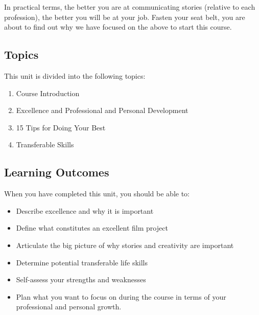 \documentclass[
]{book}
\providecommand{\tightlist}{%
  \setlength{\itemsep}{0pt}\setlength{\parskip}{0pt}}
\begin{document}
In practical terms, the better you are at communicating stories (relative to each profession), the better you will be at your job. Fasten your seat belt, you are about to find out why we have focused on the above to start this course.

\hypertarget{topics}{%
\subsection*{Topics}\label{topics}}

This unit is divided into the following topics:

\begin{enumerate}
\def\labelenumi{\arabic{enumi}.}
\tightlist
\item
  Course Introduction\\
\item
  Excellence and Professional and Personal Development\\
\item
  15 Tips for Doing Your Best\\
\item
  Transferable Skills
\end{enumerate}

\hypertarget{learning-outcomes}{%
\subsection*{Learning Outcomes}\label{learning-outcomes}}

When you have completed this unit, you should be able to:

\begin{itemize}
\tightlist
\item
  Describe excellence and why it is important\\
\item
  Define what constitutes an excellent film project\\
\item
  Articulate the big picture of why stories and creativity are important\\
\item
  Determine potential transferable life skills\\
\item
  Self-assess your strengths and weaknesses\\
\item
  Plan what you want to focus on during the course in terms of your professional and personal growth.
\end{itemize}
\end{document}
